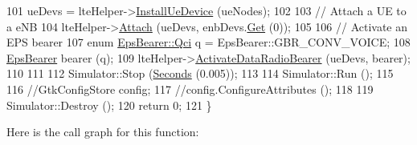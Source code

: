 \begin{DoxyCode}
101   ueDevs = lteHelper->\hyperlink{classns3_1_1LteHelper_ac9cd932d7de92811cfa953c2e3b2fc9f}{InstallUeDevice} (ueNodes);
102 
103   \textcolor{comment}{// Attach a UE to a eNB}
104   lteHelper->\hyperlink{classns3_1_1LteHelper_a9466743f826aa2652a87907b7f0a1c87}{Attach} (ueDevs, enbDevs.\hyperlink{classns3_1_1NetDeviceContainer_a677d62594b5c9d2dea155cc5045f4d0b}{Get} (0));
105 
106   \textcolor{comment}{// Activate an EPS bearer}
107   \textcolor{keyword}{enum} \hyperlink{structns3_1_1EpsBearer_aecf0c67109c5eb4ec0b07226fff5885e}{EpsBearer::Qci} q = EpsBearer::GBR\_CONV\_VOICE;
108   \hyperlink{structns3_1_1EpsBearer}{EpsBearer} bearer (q);
109   lteHelper->\hyperlink{classns3_1_1LteHelper_ac896e16cf162e4beeaa292d39ab1b700}{ActivateDataRadioBearer} (ueDevs, bearer);
110 
111 
112   Simulator::Stop (\hyperlink{group__timecivil_ga33c34b816f8ff6628e33d5c8e9713b9e}{Seconds} (0.005));
113 
114   Simulator::Run ();
115 
116   \textcolor{comment}{//GtkConfigStore config;}
117   \textcolor{comment}{//config.ConfigureAttributes ();}
118 
119   Simulator::Destroy ();
120   \textcolor{keywordflow}{return} 0;
121 \}
\end{DoxyCode}


Here is the call graph for this function\+:


